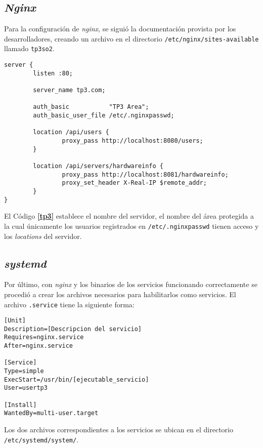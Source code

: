 \documentclass[12pt,a4paper]{article}
\begin{document}
\subsection{\emph{Nginx}}
\label{secnginx}
Para la configuración de \emph{nginx}, se siguió la documentación provista por
los desarrolladores\cite{ndoc}, creando un archivo en el directorio
\verb|/etc/nginx/sites-available| llamado \verb|tp3so2|.

\begin{lstlisting}[caption={Configuración del sitio \texttt{tp3.com.}}, label={tp3}]
server {
        listen :80;

        server_name tp3.com;

        auth_basic           "TP3 Area";
        auth_basic_user_file /etc/.nginxpasswd;

        location /api/users {
                proxy_pass http://localhost:8080/users;
        }

        location /api/servers/hardwareinfo {
                proxy_pass http://localhost:8081/hardwareinfo;
                proxy_set_header X-Real-IP $remote_addr;
        }
}
\end{lstlisting}

El Código \textbf{\ref{tp3}} establece el nombre del servidor, el nombre del
área protegida a la cual únicamente los usuarios registrados en
\verb|/etc/.nginxpasswd| tienen acceso y los \emph{locations} del servidor.

\newpage
\subsection{\emph{systemd}}
\label{secsystemd}
Por último, con \emph{nginx} y los binarios de los servicios funcionando
correctamente se procedió a crear los archivos necesarios para habilitarlos como
servicios. El archivo \verb|.service| tiene la siguiente forma:

\begin{lstlisting}[caption={Estructura del servicio.}, label={service}]
[Unit]
Description=[Descripcion del servicio]
Requires=nginx.service
After=nginx.service

[Service]
Type=simple
ExecStart=/usr/bin/[ejecutable_servicio]
User=usertp3

[Install]
WantedBy=multi-user.target
\end{lstlisting}

Los dos archivos correspondientes a los servicios se ubican en el directorio
\verb|/etc/systemd/system/|.
\end{document}
